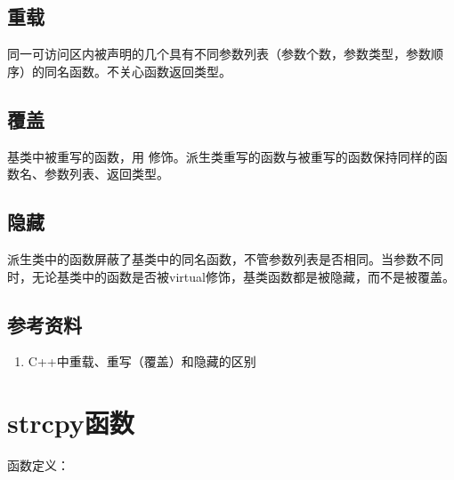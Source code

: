 \documentclass[letterpaper,10pt,english]{sphinxmanual}
\begin{document}
\subsection{重载}
\label{\detokenize{cpp/08_overload:id2}}
同一可访问区内被声明的几个具有不同参数列表（参数个数，参数类型，参数顺序）的同名函数。不关心函数返回类型。


\subsection{覆盖}
\label{\detokenize{cpp/08_overload:id3}}
基类中被重写的函数，用  修饰。派生类重写的函数与被重写的函数保持同样的函数名、参数列表、返回类型。


\subsection{隐藏}
\label{\detokenize{cpp/08_overload:id4}}
派生类中的函数屏蔽了基类中的同名函数，不管参数列表是否相同。当参数不同时，无论基类中的函数是否被virtual修饰，基类函数都是被隐藏，而不是被覆盖。


\subsection{参考资料}
\label{\detokenize{cpp/08_overload:id5}}\begin{enumerate}
\item {} 
C++中重载、重写（覆盖）和隐藏的区别

\end{enumerate}
\begin{quote}

\end{quote}


\section{strcpy函数}
\label{\detokenize{cpp/09_strcpy:strcpy}}\label{\detokenize{cpp/09_strcpy::doc}}
函数定义：
\end{document}
